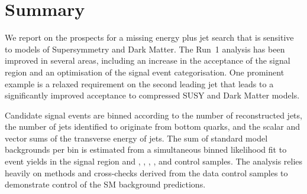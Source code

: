 \section{Summary}
\label{sec:summary}

We report on the prospects for a missing energy plus jet search that
is sensitive to models of Supersymmetry and Dark Matter.
The Run~1 analysis has been improved in several areas, including an
increase in the acceptance of the signal region and an optimisation of
the signal event categorisation. One prominent example is a relaxed
\Pt requirement on the second leading jet that leads to a
significantly improved acceptance to compressed SUSY and Dark Matter
models.

Candidate signal events are binned according to the number of
reconstructed jets, the number of jets identified to originate from
bottom quarks, and the scalar and vector sums of the transverse energy
of jets. The sum of standard model backgrounds per bin is estimated
from a simultaneous binned likelihood fit to event yields in the
signal region and \mj, \mmj, \ej, \eej, and \gj control samples. The
analysis relies heavily on methods and cross-checks derived from the
data control samples to demonstrate control of the SM background
predictions. 


